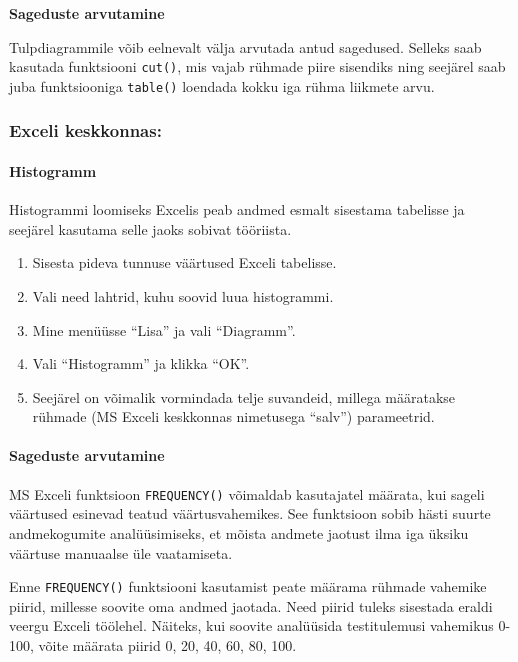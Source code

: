 \documentclass[
]{article}
\providecommand{\tightlist}{%
  \setlength{\itemsep}{0pt}\setlength{\parskip}{0pt}}
\begin{document}
\textbf{Sageduste arvutamine}

Tulpdiagrammile võib eelnevalt välja arvutada antud sagedused. Selleks
saab kasutada funktsiooni \texttt{cut()}, mis vajab rühmade piire
sisendiks ning seejärel saab juba funktsiooniga \texttt{table()}
loendada kokku iga rühma liikmete arvu.

\subsubsection{Exceli keskkonnas:}\label{exceli-keskkonnas}

\paragraph{Histogramm}\label{histogramm-1}

Histogrammi loomiseks Excelis peab andmed esmalt sisestama tabelisse ja
seejärel kasutama selle jaoks sobivat tööriista.

\begin{enumerate}
\def\labelenumi{\arabic{enumi}.}
\tightlist
\item
  Sisesta pideva tunnuse väärtused Exceli tabelisse.
\item
  Vali need lahtrid, kuhu soovid luua histogrammi.
\item
  Mine menüüsse ``Lisa'' ja vali ``Diagramm''.
\item
  Vali ``Histogramm'' ja klikka ``OK''.
\item
  Seejärel on võimalik vormindada telje suvandeid, millega määratakse
  rühmade (MS Exceli keskkonnas nimetusega ``salv'') parameetrid.
\end{enumerate}

\paragraph{Sageduste arvutamine}\label{sageduste-arvutamine}

MS Exceli funktsioon \texttt{FREQUENCY()} võimaldab kasutajatel määrata,
kui sageli väärtused esinevad teatud väärtusvahemikes. See funktsioon
sobib hästi suurte andmekogumite analüüsimiseks, et mõista andmete
jaotust ilma iga üksiku väärtuse manuaalse üle vaatamiseta.

Enne \texttt{FREQUENCY()} funktsiooni kasutamist peate määrama rühmade
vahemike piirid, millesse soovite oma andmed jaotada. Need piirid tuleks
sisestada eraldi veergu Exceli töölehel. Näiteks, kui soovite analüüsida
testitulemusi vahemikus 0-100, võite määrata piirid 0, 20, 40, 60, 80,
100.
\end{document}
